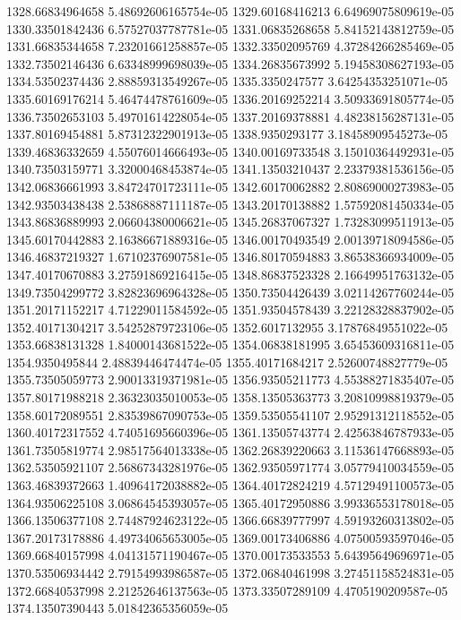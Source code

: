 {1328.66834964658 5.48692606165754e-05
1329.60168416213 6.64969075809619e-05
1330.33501842436 6.57527037787781e-05
1331.06835268658 5.84152143812759e-05
1331.66835344658 7.23201661258857e-05
1332.33502095769 4.37284266285469e-05
1332.73502146436 6.63348999698039e-05
1334.26835673992 5.19458308627193e-05
1334.53502374436 2.88859313549267e-05
1335.3350247577 3.64254353251071e-05
1335.60169176214 5.46474478761609e-05
1336.20169252214 3.50933691805774e-05
1336.73502653103 5.49701614228054e-05
1337.20169378881 4.48238156287131e-05
1337.80169454881 5.87312322901913e-05
1338.9350293177 3.18458909545273e-05
1339.46836332659 4.55076014666493e-05
1340.00169733548 3.15010364492931e-05
1340.73503159771 3.32000468453874e-05
1341.13503210437 2.23379381536156e-05
1342.06836661993 3.84724701723111e-05
1342.60170062882 2.80869000273983e-05
1342.93503438438 2.53868887111187e-05
1343.20170138882 1.57592081450334e-05
1343.86836889993 2.06604380006621e-05
1345.26837067327 1.73283099511913e-05
1345.60170442883 2.16386671889316e-05
1346.00170493549 2.00139718094586e-05
1346.46837219327 1.67102376907581e-05
1346.80170594883 3.86538366934009e-05
1347.40170670883 3.27591869216415e-05
1348.86837523328 2.16649951763132e-05
1349.73504299772 3.82823696964328e-05
1350.73504426439 3.02114267760244e-05
1351.20171152217 4.71229011584592e-05
1351.93504578439 3.22128328837902e-05
1352.40171304217 3.54252879723106e-05
1352.6017132955 3.17876849551022e-05
1353.66838131328 1.84000143681522e-05
1354.06838181995 3.65453609316811e-05
1354.9350495844 2.48839446474474e-05
1355.40171684217 2.52600748827779e-05
1355.73505059773 2.90013319371981e-05
1356.93505211773 4.55388271835407e-05
1357.80171988218 2.36323035010053e-05
1358.13505363773 3.20810998819379e-05
1358.60172089551 2.83539867090753e-05
1359.53505541107 2.95291312118552e-05
1360.40172317552 4.74051695660396e-05
1361.13505743774 2.42563846787933e-05
1361.73505819774 2.98517564013338e-05
1362.26839220663 3.11536147668893e-05
1362.53505921107 2.56867343281976e-05
1362.93505971774 3.05779410034559e-05
1363.46839372663 1.40964172038882e-05
1364.40172824219 4.57129491100573e-05
1364.93506225108 3.06864545393057e-05
1365.40172950886 3.99336553178018e-05
1366.13506377108 2.74487924623122e-05
1366.66839777997 4.59193260313802e-05
1367.20173178886 4.49734065653005e-05
1369.00173406886 4.07500593597046e-05
1369.66840157998 4.04131571190467e-05
1370.00173533553 5.64395649696971e-05
1370.53506934442 2.79154993986587e-05
1372.06840461998 3.27451158524831e-05
1372.66840537998 2.21252646137563e-05
1373.33507289109 4.4705190209587e-05
1374.13507390443 5.01842365356059e-05
}
